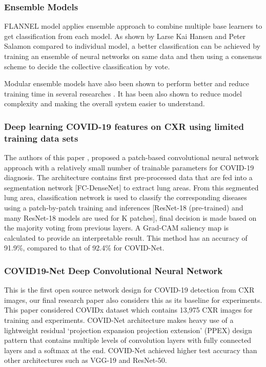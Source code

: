 \documentclass{sigkddExp}
\begin{document}
\subsubsection{Ensemble Models}

FLANNEL model applies ensemble approach to combine multiple base learners to get
classification from each model. As shown by Larse Kai Hansen and Peter Salamon
\cite{58871} compared to individual model, a better classification can be achieved
by training an ensemble of neural networks on same data and then using a
consensus scheme to decide the collective classification by vote.

Modular ensemble models have also been shown to perform better and reduce
training time in several researches \cite{combine}. It has been also shown to
reduce model complexity and making the overall system easier to understand.

\subsubsection{Deep learning COVID-19 features on CXR using limited training data sets}

The authors of this paper \cite{pmid32396075}, proposed a patch-based
convolutional neural network approach with a relatively small number of
trainable parameters for COVID-19 diagnosis. The architecture contains first
pre-processed data that are fed into a segmentation network [FC-DenseNet] to
extract lung areas. From this segmented lung area, classification network is
used to classify the corresponding diseases using a patch-by-patch training and
inferences [ResNet-18 (pre-trained) and many ResNet-18 models are used for K
        patches], final decision is made based on the majority voting from previous
layers. A Grad-CAM saliency map is calculated to provide an interpretable
result. This method has an accuracy of 91.9\%, compared to that of 92.4\% for
COVID-Net.

\subsubsection{COVID19-Net Deep Convolutional Neural Network}

This is the first open source network design for COVID-19 detection from CXR images,
our final research paper also considers this as its baseline for experiments.
This paper considered COVIDx dataset which contains 13,975 CXR images for training and
experiments. COVID-Net architecture makes heavy use of a lightweight residual
‘projection expansion projection extension’ (PPEX) design pattern that contains multiple
levels of convolution layers with fully connected layers and a softmax at the end.
COVID-Net achieved higher test accuracy than other architectures such as VGG-19 and ResNet-50.
\end{document}
